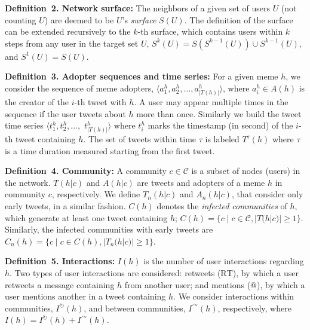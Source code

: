 \documentclass[letterpaper]{article}
\begin{document}
\noindent \textbf{Definition~2. Network surface:} 
The neighbors of a given set of users $U$ (not counting $U$) are deemed to be $U$'s \emph{surface} $S(U)$. 
The definition of the surface can be extended recursively to the $k$-th surface, which contains users within $k$ steps from any user in the target set $U$, $S^k(U) = S(S^{k-1}(U)) \cup S^{k-1}(U)$, and $S^1(U) = S(U)$. 

\noindent \textbf{Definition~3. Adopter sequences and time series:} 
For a given meme $h$, we consider the sequence of meme adopters, $\langle a_1^h, a_2^h, \dots, a_{|T(h)|}^h \rangle$, where $a_i^h \in A(h)$ is the creator of the $i$-th tweet with $h$. 
A user may appear multiple times in the sequence if the user tweets about $h$ more than once. 
Similarly we build the tweet time series $\langle t_1^h, t_2^h, \dots, $ $t_{|T(h)|}^h \rangle$ where $t_i^h$ marks the timestamp (in second) of the $i$-th tweet containing $h$.
The set of tweets within time $\tau$ is labeled $T^{\tau}(h)$ where $\tau$ is a time duration measured starting from the first tweet.


\noindent \textbf{Definition~4. Community:} 
A community $c \in \mathcal{C}$ is a subset of nodes (users) in the network. 
$T(h|c)$ and $A(h|c)$ are tweets and adopters of a meme $h$ in community $c$, respectively. 
We define $T_n(h|c)$ and $A_n(h|c)$, that consider only early tweets, in a similar fashion. 
$C(h)$ denotes the \emph{infected communities} of $h$, which generate at least one tweet containing $h$; $C(h) = \{c \; | \; c \in \mathcal{C}, |T(h|c)| \geq 1 \}$.  
Similarly, the infected communities with early tweets are $C_n(h) = \{ c \; | \; c \in C(h), |T_n(h|c)| \geq 1 \}$. 


\noindent \textbf{Definition~5. Interactions:} 
$I(h)$ is the number of user interactions regarding $h$. Two types of user interactions are considered: retweets ($\mathrm{RT}$), by which a user retweets a message containing $h$ from another user; and mentions ($\mathrm{@}$), by which a user mentions another in a tweet containing $h$.
We consider interactions within communities, $I^{\circlearrowright}(h)$, and between communities, $I^{\curvearrowright}(h)$, respectively, where $I(h) = I^{\circlearrowright}(h) + I^{\curvearrowright}(h)$. 
\end{document}
